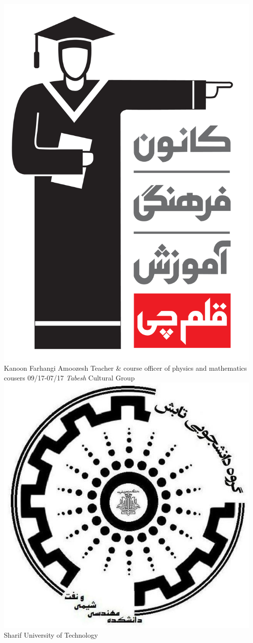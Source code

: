 \documentclass[a4paper]{friggeri-cv}
\begin{document}
\begin{entrylist}
    {\includegraphics[scale=0.005]{img/Kanoon_logo.png} Kanoon Farhangi Amoozesh}
    {Teacher \& course officer of physics and mathematics cousers}
  \entry
    {09/17-07/17}
    {   \emph{Tabesh} Cultural Group}
    {\includegraphics[scale=0.03]{img/Tabesh_logo.jpg} Sharif University of Technology}

\end{entrylist}
\end{document}
